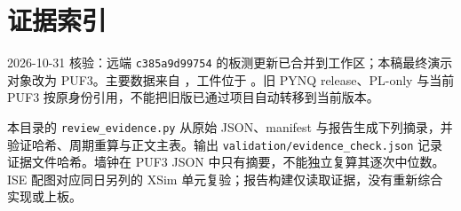 \chapter{证据索引}
\renewcommand{\thesubsection}{\thesection.\arabic{subsection}}

2026-10-31 核验：远端 \texttt{c385a9d99754} 的板测更新已合并到工作区；本稿最终演示对象改为 PUF3。主要数据来自 \pufresult，工件位于 \pufcandidate。旧 PYNQ release、PL-only 与当前 PUF3 按原身份引用，不能把旧版已通过项目自动转移到当前版本。

本目录的 \texttt{review\_evidence.py} 从原始 JSON、manifest 与报告生成下列摘录，并验证哈希、周期重算与正文主表。输出 \texttt{validation/evidence\_check.json} 记录证据文件哈希。墙钟在 PUF3 JSON 中只有摘要，不能独立复算其逐次中位数。ISE 配图对应同日另列的 XSim 单元复验；报告构建仅读取证据，没有重新综合实现或上板。

